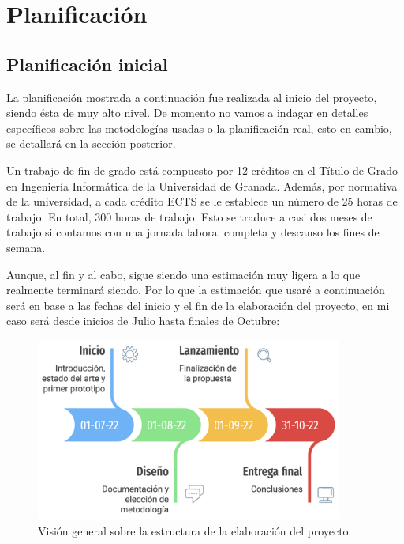 \chapter{Planificación}\label{ch:planificacion}

\section{Planificación inicial}
La planificación mostrada a continuación fue realizada al inicio del proyecto, siendo ésta de muy alto nivel. De momento no vamos a indagar en detalles específicos sobre las metodologías usadas o la planificación real, esto en cambio, se detallará en la sección posterior.

\vspace{0.3cm}

Un trabajo de fin de grado está compuesto por 12 créditos en el Título de Grado en Ingeniería Informática de la Universidad de Granada. Además, por normativa de la universidad, a cada crédito ECTS se le establece un número de 25 horas de trabajo. En total, 300 horas de trabajo. Esto se traduce a casi dos meses de trabajo si contamos con una jornada laboral completa y descanso los fines de semana.

\vspace{0.3cm}

Aunque, al fin y al cabo, sigue siendo una estimación muy ligera a lo que realmente terminará siendo. Por lo que la estimación que usaré a continuación será en base a las fechas del inicio y el fin de la elaboración del proyecto, en mi caso será desde inicios de Julio hasta finales de Octubre:

\vspace{0.3cm}

\begin{figure}[bth]

    \myfloatalign
    \includegraphics[width=0.9\textwidth]{gfx/plan-simple.png}
    \caption[Planificación inicial del proyecto]{Visión general sobre la estructura de la elaboración del proyecto.}\label{gfx:plan-simple}

\end{figure}

